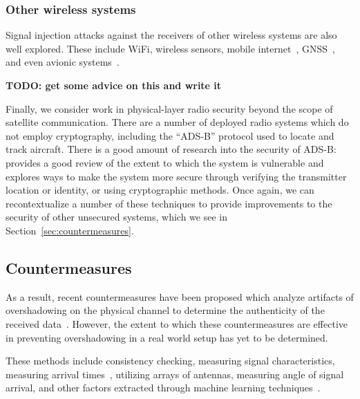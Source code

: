 

\subsubsection{Other wireless systems}

Signal injection attacks against the receivers of other wireless systems are also well explored.
These include WiFi, wireless sensors, mobile internet~\cite{yang2019hiding,erni2021adaptover}, GNSS~\cite{tippenhauer2011requirements}, and even avionic systems~\cite{sathayeWireless2019}.

\textbf{TODO: get some advice on this and write it}

Finally, we consider work in physical-layer radio security beyond the scope of satellite communication.
There are a number of deployed radio systems which do not employ cryptography, including the ``ADS-B'' protocol used to locate and track aircraft.
There is a good amount of research into the security of ADS-B: \cite{strohmeierSecurity2015} provides a good review of the extent to which the system is vulnerable and explores ways to make the system more secure through verifying the transmitter location or identity, or using cryptographic methods.
Once again, we can recontextualize a number of these techniques to provide improvements to the security of other unsecured systems, which we see in Section~\ref{sec:countermeasures}.


\subsection{Countermeasures}

As a result, recent countermeasures have been proposed which analyze artifacts of overshadowing on the physical channel to determine the authenticity of the received data~\cite{jedermann2021orbit,oligeri2020past}.
However, the extent to which these countermeasures are effective in preventing overshadowing in a real world setup has yet to be determined.

These methods include consistency checking, measuring signal characteristics, measuring arrival times~\cite{jedermann2021orbit}, utilizing arrays of antennas, measuring angle of signal arrival, and other factors extracted through machine learning techniques~\cite{oligeri2020past}.

